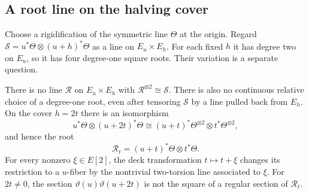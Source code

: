 \subsection{A root line on the halving cover}

Choose a rigidification of the symmetric line $\Theta$
at the origin. Regard
$\mathcal S=u^*\Theta\otimes(u+h)^*\Theta$ as a line
on $E_u\times E_h$. For each fixed $h$ it has degree two
on $E_u$, so it has four degree-one square roots.
Their variation is a separate question.

\begin{theorem}\label{ei:esf:thm:root-cover}
There is no line $\mathcal R$ on $E_u\times E_h$ with
$\mathcal R^{\otimes2}\cong\mathcal S$.
There is also no continuous relative choice of a
degree-one root, even after tensoring $\mathcal S$ by
a line pulled back from $E_h$.
On the cover $h=2t$ there is an isomorphism
\begin{equation}\label{ei:esf:eq:parallelogram}
 u^*\Theta\otimes(u+2t)^*\Theta
 \cong (u+t)^*\Theta^{\otimes2}\otimes t^*\Theta^{\otimes2},
\end{equation}
and hence the root
\begin{equation}\label{ei:esf:eq:root}
 \mathcal R_t=(u+t)^*\Theta\otimes t^*\Theta.
\end{equation}
For every nonzero $\xi\in E[2]$, the deck transformation
$t\mapsto t+\xi$ changes its restriction to a $u$-fiber
by the nontrivial two-torsion line associated to $\xi$.
For $2t\ne0$, the section
$\vartheta(u)\vartheta(u+2t)$ is not the square of a
regular section of $\mathcal R_t$.
\end{theorem}

